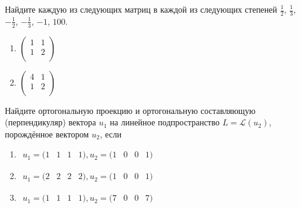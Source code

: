 \documentclass[pdftex,11pt,openany]{book}\usepackage[]{graphicx}\usepackage[]{color}
\begin{document}
\begin{problem}
Найдите каждую из следующих матриц в каждой из следующих степеней $\frac{1}{2}$, $\frac{1}{3}$, $-\frac{1}{2}$, $-\frac{1}{3}$, $-1$, $100$.
\begin{enumerate}
\item
\ensuremath{%
\begin{pmatrix}{}
    1 &   1 \\ 
    1 &   2 \\ 
  \end{pmatrix}
}
\item
\ensuremath{%
\begin{pmatrix}{}
    4 &   1 \\ 
    1 &   2 \\ 
  \end{pmatrix}
}
\end{enumerate}
\end{problem}

\begin{solution}
\end{solution}


\begin{problem}
Найдите ортогональную проекцию и ортогональную составляющую (перпендикуляр) вектора $u_1$ на линейное подпространство $L = \mathcal{L}(u_2)$, порождённое вектором $u_2$, если
\begin{enumerate}
\item $\begin{matrix} u_1 = (1 & 1 & 1 & 1), u_2 = (1 & 0 & 0 & 1) \end{matrix}$
\item $\begin{matrix} u_1 = (2 & 2 & 2 & 2), u_2 = (1 & 0 & 0 & 1) \end{matrix}$
\item $\begin{matrix} u_1 = (1 & 1 & 1 & 1), u_2 = (7 & 0 & 0 & 7) \end{matrix}$
\end{enumerate}
\end{problem}

\begin{solution}
\end{solution}
\end{document}
